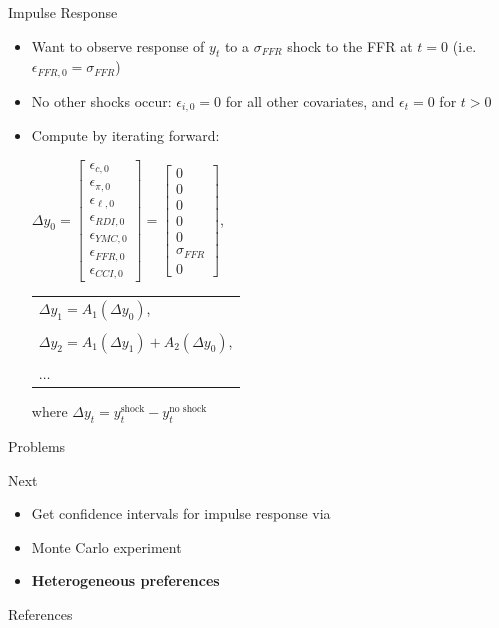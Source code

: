 \documentclass{beamer}
\begin{document}
\begin{frame}{Impulse Response}
\begin{itemize}
\item Want to observe response of $y_t$ to a $\sigma_{FFR}$ shock to the FFR at $t = 0$ (i.e. $\epsilon_{FFR,0} = \sigma_{FFR}$)
\item No other shocks occur: $\epsilon_{i,0} = 0$ for all other covariates, and $\epsilon_t = 0$ for $t > 0$
\item Compute by iterating forward:
\begin{center}
$\Delta y_0 = \begin{bmatrix} \epsilon_{c,0} \\ \epsilon_{\pi,0} \\ \epsilon_{\ell,0} \\ \epsilon_{RDI,0} \\ \epsilon_{YMC,0} \\ \epsilon_{FFR,0} \\ \epsilon_{CCI,0} \end{bmatrix} = \begin{bmatrix} 0 \\ 0 \\ 0 \\ 0 \\ 0 \\ \sigma_{FFR} \\ 0 \end{bmatrix}$, \quad
\begin{tabular}{l}
$\Delta y_1= A_1 (\Delta y_0)$, \\ \\
$\Delta y_2 = A_1 (\Delta y_1) + A_2 (\Delta y_0)$, \\ \\
$\ldots$
\end{tabular}
\end{center}
where $\Delta y_t = y_t^\text{shock} - y_t^\text{no shock}$
\end{itemize}
\end{frame}

\begin{frame}{Problems}
\end{frame}

\begin{frame}{Next}
\begin{itemize}
\item Get confidence intervals for impulse response via \cite{kilian98}
\item Monte Carlo experiment
\item \textbf{Heterogeneous preferences}
\end{itemize}
\end{frame}

\begin{frame}{References}


\end{frame}
\end{document}
